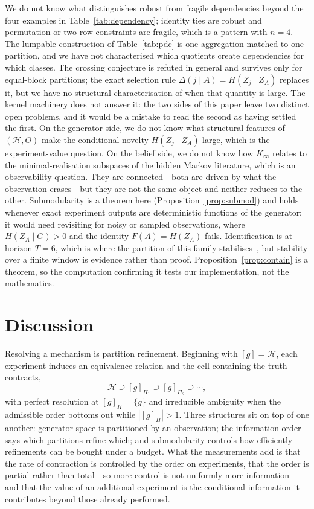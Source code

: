 \documentclass[11pt]{article}
\newcommand{\HH}{\ensuremath{\mathcal{H}}}
\begin{document}
We do not know what distinguishes robust from fragile dependencies beyond the four
examples in Table~\ref{tab:dependency}; identity ties are robust and permutation or
two-row constraints are fragile, which is a pattern with $n = 4$. The lumpable
construction of Table~\ref{tab:pdc} is one aggregation matched to one partition, and we
have not characterised which quotients create dependencies for which classes. The crossing conjecture is refuted in general and survives only for equal-block
partitions; the exact selection rule $\Delta(j \mid A) = H(Z_j \mid Z_A)$ replaces it, but we have no
structural characterisation of when that quantity is large. The kernel machinery does not
answer it: the two sides of this paper leave two distinct open problems, and it would be a
mistake to read the second as having settled the first. On the generator side, we do not
know what structural features of $(\HH, O)$ make the conditional novelty $H(Z_j \mid Z_A)$
large, which is the experiment-value question. On the belief side, we do not know how
$K_\infty$ relates to the minimal-realisation subspaces of the hidden Markov literature,
which is an observability question. They are connected---both are driven by what the
observation erases---but they are not the same object and neither reduces to the other. Submodularity is a theorem here (Proposition~\ref{prop:submod}) and holds whenever exact
experiment outputs are deterministic functions of the generator; it would need revisiting
for noisy or sampled observations, where $H(Z_A \mid G) > 0$ and the identity
$F(A) = H(Z_A)$ fails. Identification is at horizon $T=6$, which is where the partition of this family
stabilises~\cite[\S9]{paper1}, but stability over a finite window is evidence rather than
proof. Proposition~\ref{prop:contain} is a theorem, so the computation confirming it tests
our implementation, not the mathematics.

\section{Discussion}

Resolving a mechanism is partition refinement. Beginning with $[g] = \HH$, each experiment
induces an equivalence relation and the cell containing the truth contracts,
\[
  \HH \supseteq [g]_{\Pi_1} \supseteq [g]_{\Pi_2} \supseteq \cdots ,
\]
with perfect resolution at $[g]_\Pi = \{g\}$ and irreducible ambiguity when the admissible
order bottoms out while $|[g]_\Pi| > 1$. Three structures sit on top of one another:
generator space is partitioned by an observation; the information order says which
partitions refine which; and submodularity controls how efficiently refinements can be
bought under a budget. What the measurements add is that the rate of contraction is controlled by the order on
experiments, that the order is partial rather than total---so more control is not
uniformly more information---and that the value of an additional experiment is the
conditional information it contributes beyond those already performed.
\end{document}
